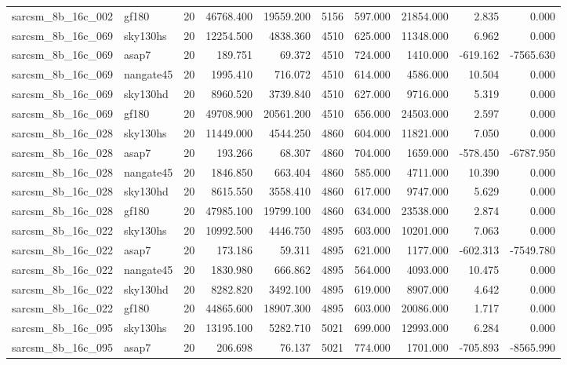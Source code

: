 \begin{longtable}{llrrrrrrrr}
sarcsm\_8b\_16c\_002 & gf180 & 20 & 46768.400 & 19559.200 & 5156 & 597.000 & 21854.000 & 2.835 & 0.000 \\
sarcsm\_8b\_16c\_069 & sky130hs & 20 & 12254.500 & 4838.360 & 4510 & 625.000 & 11348.000 & 6.962 & 0.000 \\
sarcsm\_8b\_16c\_069 & asap7 & 20 & 189.751 & 69.372 & 4510 & 724.000 & 1410.000 & -619.162 & -7565.630 \\
sarcsm\_8b\_16c\_069 & nangate45 & 20 & 1995.410 & 716.072 & 4510 & 614.000 & 4586.000 & 10.504 & 0.000 \\
sarcsm\_8b\_16c\_069 & sky130hd & 20 & 8960.520 & 3739.840 & 4510 & 627.000 & 9716.000 & 5.319 & 0.000 \\
sarcsm\_8b\_16c\_069 & gf180 & 20 & 49708.900 & 20561.200 & 4510 & 656.000 & 24503.000 & 2.597 & 0.000 \\
sarcsm\_8b\_16c\_028 & sky130hs & 20 & 11449.000 & 4544.250 & 4860 & 604.000 & 11821.000 & 7.050 & 0.000 \\
sarcsm\_8b\_16c\_028 & asap7 & 20 & 193.266 & 68.307 & 4860 & 704.000 & 1659.000 & -578.450 & -6787.950 \\
sarcsm\_8b\_16c\_028 & nangate45 & 20 & 1846.850 & 663.404 & 4860 & 585.000 & 4711.000 & 10.390 & 0.000 \\
sarcsm\_8b\_16c\_028 & sky130hd & 20 & 8615.550 & 3558.410 & 4860 & 617.000 & 9747.000 & 5.629 & 0.000 \\
sarcsm\_8b\_16c\_028 & gf180 & 20 & 47985.100 & 19799.100 & 4860 & 634.000 & 23538.000 & 2.874 & 0.000 \\
sarcsm\_8b\_16c\_022 & sky130hs & 20 & 10992.500 & 4446.750 & 4895 & 603.000 & 10201.000 & 7.063 & 0.000 \\
sarcsm\_8b\_16c\_022 & asap7 & 20 & 173.186 & 59.311 & 4895 & 621.000 & 1177.000 & -602.313 & -7549.780 \\
sarcsm\_8b\_16c\_022 & nangate45 & 20 & 1830.980 & 666.862 & 4895 & 564.000 & 4093.000 & 10.475 & 0.000 \\
sarcsm\_8b\_16c\_022 & sky130hd & 20 & 8282.820 & 3492.100 & 4895 & 619.000 & 8907.000 & 4.642 & 0.000 \\
sarcsm\_8b\_16c\_022 & gf180 & 20 & 44865.600 & 18907.300 & 4895 & 603.000 & 20086.000 & 1.717 & 0.000 \\
sarcsm\_8b\_16c\_095 & sky130hs & 20 & 13195.100 & 5282.710 & 5021 & 699.000 & 12993.000 & 6.284 & 0.000 \\
sarcsm\_8b\_16c\_095 & asap7 & 20 & 206.698 & 76.137 & 5021 & 774.000 & 1701.000 & -705.893 & -8565.990 \\

\end{longtable}
